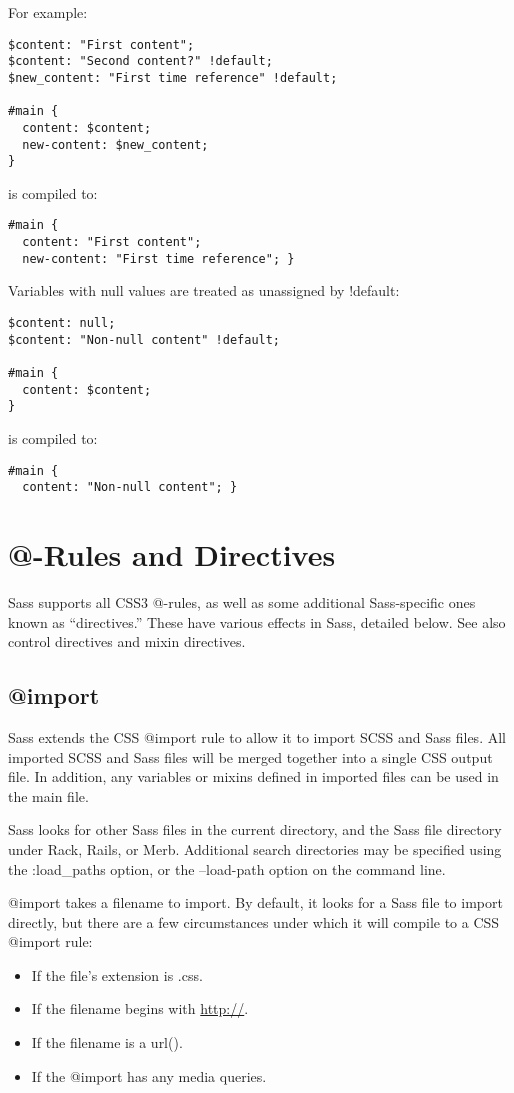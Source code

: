 \documentclass[10pt]{article}
\begin{document}
 For example:
\begin{verbatim}
$content: "First content";
$content: "Second content?" !default;
$new_content: "First time reference" !default;

#main {
  content: $content;
  new-content: $new_content;
}
\end{verbatim}


 is compiled to:
\begin{verbatim}
#main {
  content: "First content";
  new-content: "First time reference"; }
\end{verbatim}


 Variables with null values are treated as unassigned by !default:
\begin{verbatim}
$content: null;
$content: "Non-null content" !default;

#main {
  content: $content;
}
\end{verbatim}


 is compiled to:
\begin{verbatim}
#main {
  content: "Non-null content"; }
\end{verbatim}
\section{@-Rules and Directives}


 Sass supports all CSS3 @-rules, as well as some additional Sass-specific ones known as “directives.” These have various effects in Sass, detailed below. See also control directives and mixin directives.
\subsection{@import}


 Sass extends the CSS @import rule to allow it to import SCSS and Sass files. All imported SCSS and Sass files will be merged together into a single CSS output file. In addition, any variables or mixins defined in imported files can be used in the main file.


 Sass looks for other Sass files in the current directory, and the Sass file directory under Rack, Rails, or Merb. Additional search directories may be specified using the :load\_paths option, or the --load-path option on the command line.


 @import takes a filename to import. By default, it looks for a Sass file to import directly, but there are a few circumstances under which it will compile to a CSS @import rule:
\begin{itemize}
\item If the file’s extension is .css.
\item If the filename begins with \url{http://}.
\item If the filename is a url().
\item If the @import has any media queries.

\end{itemize}
\end{document}
